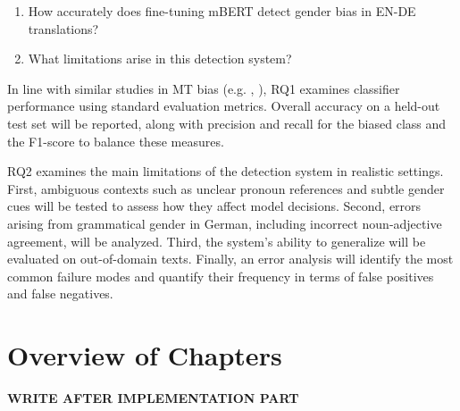    \begin{enumerate}[label=\textbf{RQ\arabic*:}]
    \item How accurately does fine-tuning mBERT detect gender bias in EN-DE translations?
    \item What limitations arise in this detection system?
    \end{enumerate}

    In line with similar studies in MT bias (e.g. \textcite{smacchiaDoesAIReflect2024}, \textcite{rescignoGenderBiasMachine2023}), RQ1 examines classifier performance using standard evaluation metrics. Overall accuracy on a held-out test set will be reported, along with precision and recall for the biased class and the F1-score to balance these measures. 
    
    RQ2 examines the main limitations of the detection system in realistic settings. First, ambiguous contexts such as unclear pronoun references and subtle gender cues will be tested to assess how they affect model decisions. Second, errors arising from grammatical gender in German, including incorrect noun-adjective agreement, will be analyzed. Third, the system’s ability to generalize will be evaluated on out-of-domain texts. Finally, an error analysis will identify the most common failure modes and quantify their frequency in terms of false positives and false negatives.

\section{Overview of Chapters}
\textbf{WRITE AFTER IMPLEMENTATION PART}
